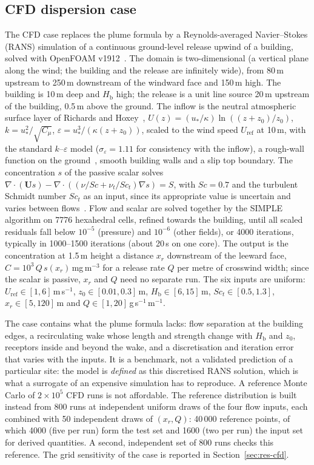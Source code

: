 \subsection{CFD dispersion case}
\label{sec:cfd}
The CFD case replaces the plume formula by a Reynolds-averaged
Navier--Stokes (RANS) simulation of a continuous ground-level release
upwind of a building, solved with OpenFOAM v1912~\cite{weller1998}. The
domain is two-dimensional (a vertical plane along the wind; the building
and the release are infinitely wide), from 80\,m upstream to 250\,m
downstream of the windward face and 150\,m high. The building is 10\,m deep
and $H_{\mathrm b}$ high; the release is a unit line source 20\,m upstream
of the building, 0.5\,m above the ground. The inflow is the neutral
atmospheric surface layer of Richards and Hoxey~\cite{richards1993},
$U(z)=(u_*/\kappa)\ln((z+z_0)/z_0)$, $k=u_*^2/\sqrt{C_\mu}$,
$\varepsilon=u_*^3/(\kappa(z+z_0))$, scaled to the wind speed
$U_{\mathrm{ref}}$ at 10\,m, with the standard $k$--$\varepsilon$ model
($\sigma_\varepsilon=1.11$ for consistency with the inflow), a rough-wall
function on the ground~\cite{blocken2007}, smooth building walls and a slip
top boundary. The concentration $s$ of the passive scalar solves
$\nabla\cdot(\mathbf U s)-\nabla\cdot((\nu/Sc+\nu_t/Sc_t)\nabla s)=S$, with
$Sc=0.7$ and the turbulent Schmidt number $Sc_t$ as an input, since its
appropriate value is uncertain and varies between flows~\cite{tominaga2007}.
Flow and scalar are solved together by the SIMPLE algorithm on 7776
hexahedral cells, refined towards the building, until all scaled residuals
fall below $10^{-5}$ (pressure) and $10^{-6}$ (other fields), or 4000
iterations, typically in
1000--1500 iterations (about 20\,s on one core). The output is the
concentration at 1.5\,m height a distance $x_r$ downstream of the leeward
face, $C=10^3\,Q\,s(x_r)$\,mg\,m$^{-3}$ for a release rate $Q$ per metre of
crosswind width; since the scalar is passive, $x_r$ and $Q$ need no
separate run. The six inputs are uniform: $U_{\mathrm{ref}}\in[1,6]$\,m\,s$^{-1}$,
$z_0\in[0.01,0.3]$\,m, $H_{\mathrm b}\in[6,15]$\,m, $Sc_t\in[0.5,1.3]$,
$x_r\in[5,120]$\,m and $Q\in[1,20]$\,g\,s$^{-1}$\,m$^{-1}$.

The case contains what the plume formula lacks: flow separation at the
building edges, a recirculating wake whose length and strength change with
$H_{\mathrm b}$ and $z_0$, receptors inside and beyond the wake, and a
discretisation and iteration error that varies with the inputs. It is a
benchmark, not a validated prediction of a particular site: the model is
\emph{defined} as this discretised RANS solution, which is what a surrogate
of an expensive simulation has to reproduce. A reference Monte Carlo of
$2\times10^5$ CFD runs is not affordable. The reference distribution is
built instead from 800 runs at independent uniform draws of the four flow
inputs, each combined with 50 independent draws of $(x_r,Q)$: 40\,000
reference points, of which 4000 (five per run) form the test set and 1600
(two per run) the input set for derived quantities. A second, independent
set of 800 runs checks this reference. The grid sensitivity of the case is
reported in Section~\ref{sec:res-cfd}.


